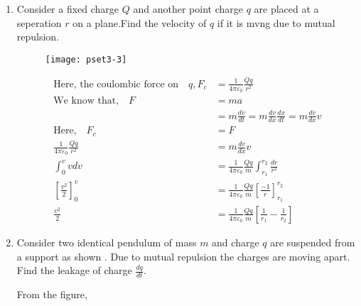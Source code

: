 \begin{enumerate}[label=\color{ocre}\textbf{\arabic*.}]
\begin{enumerate}
\begin{answer}
\begin{enumerate}[label=(\alph*)]
		\end{enumerate}
	\end{answer}
\end{enumerate}
\item Consider a fixed charge $Q$ and another point charge $q$ are placed at a seperation $r$ on a plane.Find the velocity of $q$ if it is mvng due to mutual repulsion.\begin{figure}[H]
	\begin{center}
		\texttt{[image: pset3-3]}
	\end{center}
\end{figure}
\begin{answer}
	\begin{align*}
	\text{Here, the coulombic force on}\quad q,F_{c}&=\frac{1}{4 \pi \varepsilon_{0}} \frac{Qq}{r^{2}}\\
	\text{We know that,}\quad F&=ma\\
	&=m\frac{dv}{dt}=m\frac{dv}{dx}\frac{dx}{dt}=m\frac{dv}{dx} v\\
	\text{Here,}\quad F_{c}&=F\\
	\frac{1}{4 \pi \varepsilon_{0}} \frac{Qq}{r^{2}}&=m\frac{dv}{dx} v\\
	\int_{0}^{v}v dv&=\frac{1}{4 \pi \varepsilon_{0}} \frac{Qq}{m} \int_{r_{1}}^{r_{2}}\frac{dr}{r^{2}}\\
	\left[ \frac{v^{2}}{2}\right] _{0}^{v}&=\frac{1}{4 \pi \varepsilon_{0}} \frac{Qq}{m} \left[ \frac{-1}{r}\right] _{r_{1}}^{r_{2}}\\
	\frac{v^{2}}{2}&=\frac{1}{4 \pi \varepsilon_{0}} \frac{Qq}{m}\left[ \frac{1}{r_{1}}-\frac{1}{r_{2}}\right] 
	\end{align*}

\end{answer}
\item Consider two identical pendulum of mass $m$ and charge $q$ are suspended from a support as shown . Due to mutual repulsion the charges are moving apart. Find the leakage of charge $\frac{dq}{dt}$.
\begin{answer} From the figure,\\
	\begin{figure}[H]
	\begin{minipage}{0.35\textwidth}
		

\end{minipage}
\end{figure}
\end{answer}
\end{enumerate}
